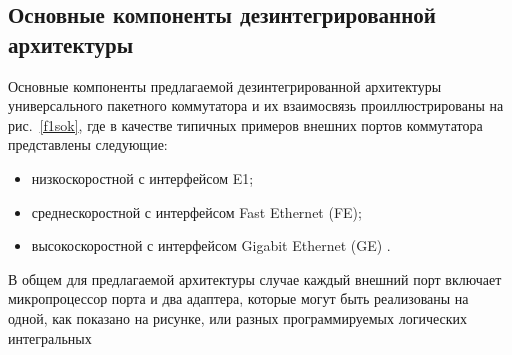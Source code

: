 \begin{multicols}{2}
\section{Основные компоненты дезинтегрированной архитектуры}

  Основные компоненты предлагаемой дезинтегрированной архитектуры универсального
пакетного коммутатора и их взаимосвязь проиллюстрированы на рис.~\ref{f1sok}, где в качестве
типичных примеров внешних портов коммутатора представлены следующие:
    \begin{itemize}
\item низкоскоростной с интерфейсом E1;
\item среднескоростной с интерфейсом Fast Ethernet (FE);
\item высокоскоростной с интерфейсом Gigabit Ethernet (GE) .
\end{itemize}

    В общем для предлагаемой архитектуры случае каждый внешний порт включает
микропроцессор порта и два адаптера, которые могут быть реализованы на одной, как показано
на рисунке, или разных программируемых логических интегральных\linebreak\vspace*{-12pt}
\pagebreak
\end{multicols}

\begin{figure} %
\vspace*{1pt}
\begin{center}
\mbox{%
\epsfxsize=157.246mm
}
\end{center}
\vspace*{-9pt}
\end{figure}

